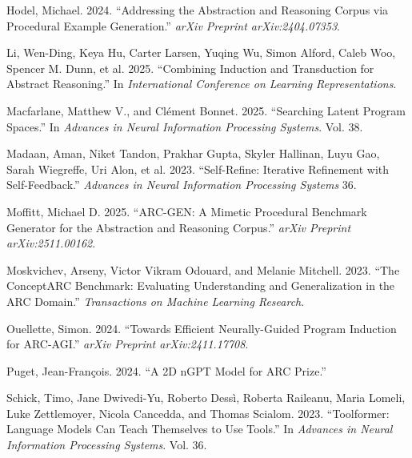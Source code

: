 \documentclass[11pt]{article}
\newlength{\cslhangindent}
\newenvironment{CSLReferences}[2] %
  {\setlength{\parindent}{0pt}%
   \setlength{\parskip}{#2\baselineskip}%
   \ifodd #1\relax
     \setlength{\leftskip}{\cslhangindent}%
     \setlength{\parindent}{-\cslhangindent}%
   \fi}
  {}
\begin{document}
\begin{CSLReferences}{1}{0}
\leavevmode{}%
Hodel, Michael. 2024. {``Addressing the Abstraction and Reasoning Corpus
via Procedural Example Generation.''} \emph{arXiv Preprint
arXiv:2404.07353}.

\leavevmode{}%
Li, Wen-Ding, Keya Hu, Carter Larsen, Yuqing Wu, Simon Alford, Caleb
Woo, Spencer M. Dunn, et al. 2025. {``Combining Induction and
Transduction for Abstract Reasoning.''} In \emph{International
Conference on Learning Representations}.

\leavevmode{}%
Macfarlane, Matthew V., and Clément Bonnet. 2025. {``Searching Latent
Program Spaces.''} In \emph{Advances in Neural Information Processing
Systems}. Vol. 38.

\leavevmode{}%
Madaan, Aman, Niket Tandon, Prakhar Gupta, Skyler Hallinan, Luyu Gao,
Sarah Wiegreffe, Uri Alon, et al. 2023. {``Self-Refine: Iterative
Refinement with Self-Feedback.''} \emph{Advances in Neural Information
Processing Systems} 36.

\leavevmode{}%
Moffitt, Michael D. 2025. {``{ARC-GEN}: A Mimetic Procedural Benchmark
Generator for the Abstraction and Reasoning Corpus.''} \emph{arXiv
Preprint arXiv:2511.00162}.

\leavevmode{}%
Moskvichev, Arseny, Victor Vikram Odouard, and Melanie Mitchell. 2023.
{``The {ConceptARC} Benchmark: Evaluating Understanding and
Generalization in the {ARC} Domain.''} \emph{Transactions on Machine
Learning Research}.

\leavevmode{}%
Ouellette, Simon. 2024. {``Towards Efficient Neurally-Guided Program
Induction for {ARC-AGI}.''} \emph{arXiv Preprint arXiv:2411.17708}.

\leavevmode{}%
Puget, Jean-François. 2024. {``A {2D} {nGPT} Model for {ARC} Prize.''}

\leavevmode{}%
Schick, Timo, Jane Dwivedi-Yu, Roberto Dessì, Roberta Raileanu, Maria
Lomeli, Luke Zettlemoyer, Nicola Cancedda, and Thomas Scialom. 2023.
{``Toolformer: Language Models Can Teach Themselves to Use Tools.''} In
\emph{Advances in Neural Information Processing Systems}. Vol. 36.


\end{CSLReferences}
\end{document}

